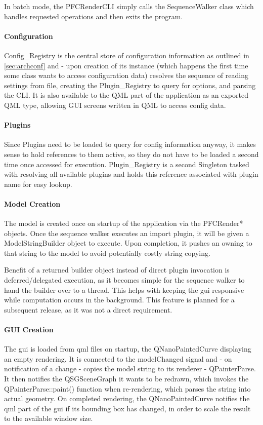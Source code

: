 In batch mode, the PFCRenderCLI simply calls the SequenceWalker class which handles requested operations and then exits the program.

\paragraph{Configuration}
Config\_Registry is the central store of configuration information as outlined in \ref{sec:archconf} and - upon creation of its instance (which happens the first time some class wants to access configuration data) resolves the sequence of reading settings from file, creating the Plugin\_Registry to query for options, and parsing the CLI. It is also available to the QML part of the application as an exported QML type, allowing GUI screens written in QML to access config data.

\paragraph{Plugins} Since Plugins need to be loaded to query for config information anyway, it makes sense to hold references to them active, so they do not have to be loaded a second time once accessed for execution. Plugin\_Registry is a second Singleton tasked with resolving all available plugins and holds this reference associated with plugin name for easy lookup.

\paragraph{Model Creation} The model is created once on startup of the application via the PFCRender* objects. Once the sequence walker executes an import plugin, it will be given a ModelStringBuilder object to execute. Upon completion, it pushes an owning  to that string to the model to avoid potentially costly string copying.

Benefit of a returned builder object instead of direct plugin invocation is deferred/delegated execution, as it becomes simple for the sequence walker to hand the builder over to a thread. This helps with keeping the \gls{gui} responsive while computation occurs in the background. This feature is planned for a subsequent release, as it was not a direct requirement.

\paragraph{GUI Creation} The \gls{gui} is loaded from \gls{qml} files on startup, the QNanoPaintedCurve displaying an empty rendering. It is connected to the modelChanged signal and - on notification of a change - copies the model string to its renderer - QPainterParse. It then notifies the QSGSceneGraph it wants to be redrawn, which invokes the QPainterParse::paint() function when re-rendering, which parses the string into actual geometry. On completed rendering, the QNanoPaintedCurve notifies the \gls{qml} part of the \gls{gui} if its \gls{bounding box} has changed, in order to scale the result to the available window size.

